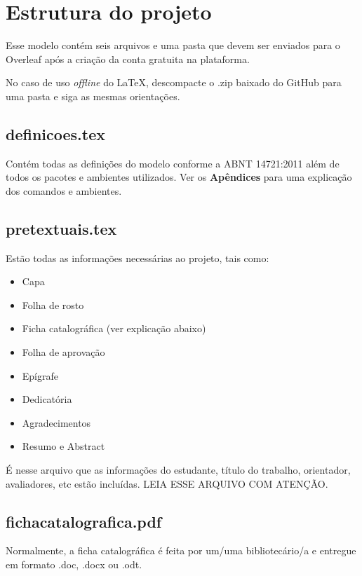 \documentclass[a4paper,12pt,oneside,openright,extrafontsizes,openbib]{memoir}
\begin{document}
{{\chapter{Estrutura do projeto}

Esse modelo contém seis arquivos e uma pasta que devem ser enviados para o Overleaf após a criação da conta gratuita na plataforma.

No caso de uso \textit{offline} do \LaTeX, descompacte o .zip baixado do GitHub para uma pasta e siga as mesmas orientações.

\section{definicoes.tex}

Contém todas as definições do modelo conforme a ABNT 14721:2011 além de todos os pacotes e ambientes utilizados. Ver os \textbf{Apêndices} para uma explicação dos comandos e ambientes.

\section{pretextuais.tex}

Estão todas as informações necessárias ao projeto, tais como:

\begin{itemize}
    \item Capa
    \item Folha de rosto
    \item Ficha catalográfica (ver explicação abaixo)
    \item Folha de aprovação
    \item Epígrafe
    \item Dedicatória
    \item Agradecimentos
    \item Resumo e Abstract
\end{itemize}

É nesse arquivo que as informações do estudante, título do trabalho, orientador, avaliadores, etc estão incluídas. \textsc{LEIA ESSE ARQUIVO COM ATENÇÃO.}

\section{fichacatalografica.pdf}

Normalmente, a ficha catalográfica é feita por um/uma bibliotecário/a e entregue em formato .doc, .docx ou .odt. 

}}
\end{document}
